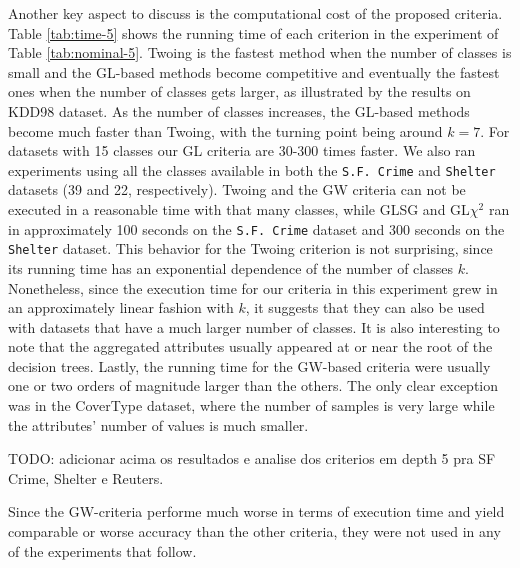Another key aspect to discuss is the computational cost of the
proposed criteria. Table \ref{tab:time-5} shows the running time of each criterion in the experiment of Table \ref{tab:nominal-5}. Twoing is the fastest method when the number of classes is small and the GL-based methods become competitive and eventually the
fastest ones when the number of classes gets larger, as illustrated by the results on KDD98 dataset. As the number of classes increases, the GL-based methods become much faster than Twoing, with the turning point being around $k=7$. For datasets with 15 classes our GL criteria are 30-300 times faster. We also ran experiments using all the classes available in both the {\tt S.F. Crime} and {\tt Shelter} datasets (39 and 22, respectively). Twoing and the GW criteria can not be executed in a reasonable time with that many classes, while GLSG and GL$\chi^2$ ran in approximately 100 seconds on the {\tt S.F. Crime} dataset and  300 seconds on the {\tt Shelter} dataset.  This behavior for the Twoing criterion is not surprising, since its running time has an exponential dependence of the number of classes $k$. Nonetheless, since the execution time for our criteria in this experiment grew in an approximately linear fashion with $k$, it suggests that they can also be used with datasets that have a much larger number of classes. It is also interesting to note that the aggregated attributes usually appeared at or near the root of the decision trees. Lastly, the running time for the GW-based criteria were usually one or two orders of magnitude larger than the others. The only clear exception was in the CoverType dataset, where the number of samples is very large while the attributes’ number of values is much smaller.

TODO: adicionar acima os resultados e analise dos criterios em depth 5 pra SF Crime, Shelter e Reuters.

Since the GW-criteria performe much worse in terms of execution time and yield comparable or worse accuracy than the other criteria, they were not used in any of the experiments that follow.

